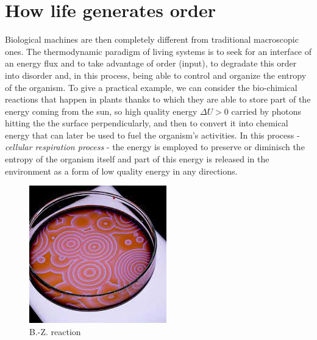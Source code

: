 \documentclass[../main/main.tex]{subfiles}
\begin{document}
\section{How life generates order}


Biological machines are then completely different from traditional macroscopic ones. The thermodynamic paradigm of living systems is to seek for an interface of an energy flux and to take advantage of order (input), to degradate this order into disorder and, in this process, being able to control and organize the entropy of the organism. 
To give a practical example, we can consider the bio-chimical reactions that happen in plants thanks to which they are able to store part of the energy coming from the sun, so high quality energy $\Delta U>0$ carried by photons hitting the the surface perpendicularly, and then to convert it into chemical energy that can later be used to fuel the organism's activities. 
In this process - \emph{cellular respiration process} - the energy is employed to preserve or diminisch the entropy of the organism itself and part of this energy is released in the environment as a form of low quality energy in any directions.

\begin{figure}
    \centering
    \includegraphics[width=0.8\linewidth]{../frontespizio/tikz/1_lesson/Belousov-Zhabotinsky reaction.jpeg}
    \caption{B.-Z. reaction\cite{nat_geo}}
\end{figure}
\end{document}
